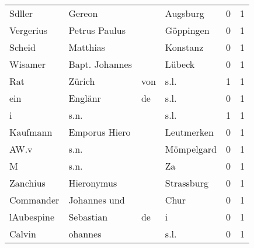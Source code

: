\begin{tabular}{llllrr}
                   Sdller &                             Gereon &             &                                    Augsburg &          0 &         1 \\
                Vergerius &                      Petrus Paulus &             &                                   Göppingen &          0 &         1 \\
                   Scheid &                           Matthias &             &                                    Konstanz &          0 &         1 \\
                  Wisamer &                     Bapt. Johannes &             &                                      Lübeck &          0 &         1 \\
                      Rat &                             Zürich &         von &                                        s.l. &          1 &         1 \\
                      ein &                            Englänr &          de &                                        s.l. &          0 &         1 \\
                        i &                               s.n. &             &                                        s.l. &          1 &         1 \\
                 Kaufmann &                      Emporus Hiero &             &                                  Leutmerken &          0 &         1 \\
                     AW.v &                               s.n. &             &                                  Mömpelgard &          0 &         1 \\
                        M &                               s.n. &             &                                          Za &          0 &         1 \\
                 Zanchius &                         Hieronymus &             &                                  Strassburg &          0 &         1 \\
                Commander &                       Johannes und &             &                                        Chur &          0 &         1 \\
               lAubespine &                          Sebastian &          de &                                           i &          0 &         1 \\
                   Calvin &                            ohannes &             &                                        s.l. &          0 &         1 \\

\end{tabular}
